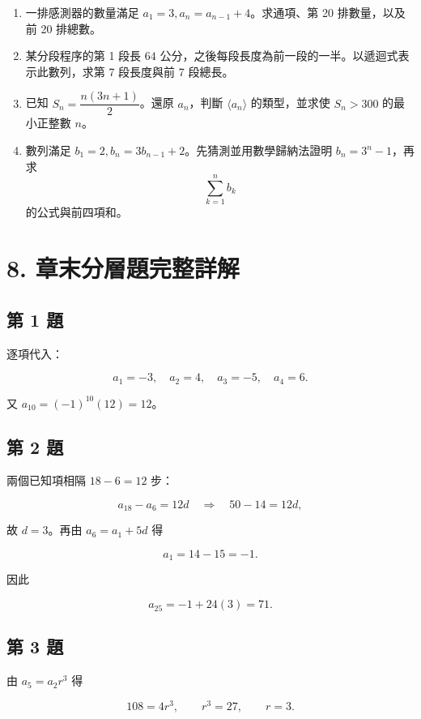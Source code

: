 \documentclass[11pt,a4paper]{article}
\providecommand{\tightlist}{%
  \setlength{\itemsep}{0pt}\setlength{\parskip}{0pt}}
\begin{document}
\begin{enumerate}
\def\labelenumi{\arabic{enumi}.}
\setcounter{enumi}{12}
\tightlist
\item
  一排感測器的數量滿足 \(a_1=3,a_n=a_{n-1}+4\)。求通項、第 20 排數量，以及前 20 排總數。
\item
  某分段程序的第 1 段長 \(64\) 公分，之後每段長度為前一段的一半。以遞迴式表示此數列，求第 7 段長度與前 7 段總長。
\item
  已知 \(S_n=\dfrac{n(3n+1)}2\)。還原 \(a_n\)，判斷 \(\langle a_n\rangle\) 的類型，並求使 \(S_n>300\) 的最小正整數 \(n\)。
\item
  數列滿足 \(b_1=2,b_n=3b_{n-1}+2\)。先猜測並用數學歸納法證明 \(b_n=3^n-1\)，再求
  \[
  \sum_{k=1}^{n}b_k
  \]
  的公式與前四項和。
\end{enumerate}

\section{8. 章末分層題完整詳解}\label{ux7ae0ux672bux5206ux5c64ux984cux5b8cux6574ux8a73ux89e3}

\subsection{第 1 題}\label{ux7b2c-1-ux984c}

逐項代入：

\[
a_1=-3,\quad a_2=4,\quad a_3=-5,\quad a_4=6.
\]

又 \(a_{10}=(-1)^{10}(12)=12\)。

\subsection{第 2 題}\label{ux7b2c-2-ux984c}

兩個已知項相隔 \(18-6=12\) 步：

\[
a_{18}-a_6=12d
\quad\Longrightarrow\quad
50-14=12d,
\]

故 \(d=3\)。再由 \(a_6=a_1+5d\) 得

\[
a_1=14-15=-1.
\]

因此

\[
a_{25}=-1+24(3)=71.
\]

\subsection{第 3 題}\label{ux7b2c-3-ux984c}

由 \(a_5=a_2r^3\) 得

\[
108=4r^3,\qquad r^3=27,\qquad r=3.
\]
\end{document}
